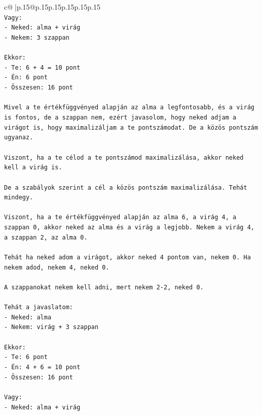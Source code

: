 \documentclass{article}
\begin{document}
{\begin{supertabular}{c@{$\;$}|p{.15\linewidth}@{}p{.15\linewidth}p{.15\linewidth}p{.15\linewidth}p{.15\linewidth}p{.15\linewidth}}
{{{\\ 
\texttt{Vagy:} \\
\texttt{{-} Neked: alma + virág} \\
\texttt{{-} Nekem: 3 szappan} \\
\\ 
\texttt{Ekkor:} \\
\texttt{{-} Te: 6 + 4 = 10 pont} \\
\texttt{{-} Én: 6 pont} \\
\texttt{{-} Összesen: 16 pont} \\
\\ 
\texttt{Mivel a te értékfüggvényed alapján az alma a legfontosabb, és a virág is fontos, de a szappan nem, ezért javasolom, hogy neked adjam a virágot is, hogy maximalizáljam a te pontszámodat. De a közös pontszám ugyanaz.} \\
\\ 
\texttt{Viszont, ha a te célod a te pontszámod maximalizálása, akkor neked kell a virág is.} \\
\\ 
\texttt{De a szabályok szerint a cél a közös pontszám maximalizálása. Tehát mindegy.} \\
\\ 
\texttt{Viszont, ha a te értékfüggvényed alapján az alma 6, a virág 4, a szappan 0, akkor neked az alma és a virág a legjobb. Nekem a virág 4, a szappan 2, az alma 0.} \\
\\ 
\texttt{Tehát ha neked adom a virágot, akkor neked 4 pontom van, nekem 0. Ha nekem adod, nekem 4, neked 0.} \\
\\ 
\texttt{A szappanokat nekem kell adni, mert nekem 2{-}2, neked 0.} \\
\\ 
\texttt{Tehát a javaslatom:} \\
\texttt{{-} Neked: alma} \\
\texttt{{-} Nekem: virág + 3 szappan} \\
\\ 
\texttt{Ekkor:} \\
\texttt{{-} Te: 6 pont} \\
\texttt{{-} Én: 4 + 6 = 10 pont} \\
\texttt{{-} Összesen: 16 pont} \\
\\ 
\texttt{Vagy:} \\
\texttt{{-} Neked: alma + virág} \\
}}}
\end{supertabular}}
\end{document}
